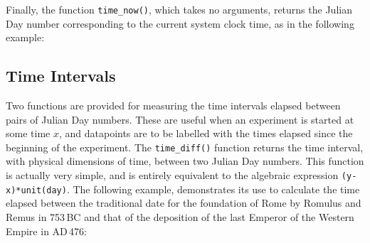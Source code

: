 Finally, the function {\tt time\_now()}, which takes no
arguments, returns the Julian Day number corresponding to the current system
clock time, as in the following example:

\vspace{3mm}
\newline
{}
\vspace{3mm}


\subsection{Time Intervals}

Two functions are provided for measuring the time intervals elapsed between
pairs of Julian Day numbers.  These are useful when an experiment is started at
some time $x$, and datapoints are to be labelled with the times elapsed since
the beginning of the experiment. The {\tt time\_diff()}
function returns the time
interval, with physical dimensions of time, between two Julian Day numbers.
This function is actually very simple, and is entirely equivalent to the
algebraic expression {\tt (y-x)*unit(day)}. The following example, demonstrates
its use to calculate the time elapsed between the traditional date for the
foundation of Rome by Romulus and Remus in 753\,{\footnotesize BC} and that of
the deposition of the last Emperor of the Western Empire in {\footnotesize
AD}\,476:

